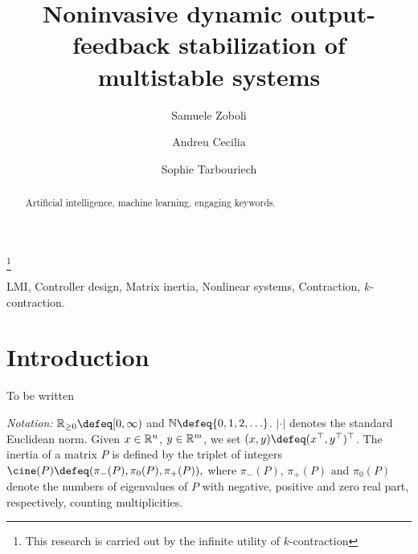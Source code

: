 \documentclass{ifacconf}
\begin{document}
	\begin{frontmatter}
		
		\title{Noninvasive dynamic output-feedback stabilization of multistable systems} 
		
		\thanks[footnoteinfo]{This research is carried out by the infinite utility of $k$-contraction}
		
		\author[First]{Samuele Zoboli} 		
        \author[Second]{Andreu Cecilia}
	\author[First]{Sophie Tarbouriech}
 
		\address[Second]{Universitat Polit\`ecnica de Catalunya, Avinguda Diagonal, 647, 08028 Barcelona, Spain, (e-mail: andreu.cecilia@upc.edu)}
  \address[First]{LAAS-CNRS, Universit\'e de Toulouse, CNRS, Toulouse, (e-mail: samuele.zoboli@laas.fr, sophie.tarbouriech@laas.fr)}
		
		\begin{abstract}                %
   Artificial intelligence, machine learning, engaging keywords.
		\end{abstract}
		
		\begin{keyword}
			LMI, Controller design, Matrix inertia, Nonlinear systems, Contraction, $k$-contraction.
		\end{keyword}
		
	\end{frontmatter}


\section{Introduction}
{\color{red} To be written}

\medskip
\emph{Notation:}  $\RR_{\geq0}\defeq[0,\infty)$ and
$\NN \defeq \{0,1,2,\ldots\}$. $|\cdot|$ denotes the standard Euclidean norm.
Given $x\in {\mathbb{R}}^n$, $y\in {\mathbb{R}}^m$, we set 
$(x,y)\defeq (x^\top , y^\top)^\top$.
The inertia of a matrix $P$ 
is defined by the triplet of integers
$
\cine(P) \defeq (\pi_{-}(P),  \pi_{0}(P), \pi_{+}(P)),
$
where $\pi_{-}({P})$, $\pi_{+}(P)$ and $\pi_{0}(P)$ denote the numbers of eigenvalues of $P$ with negative,
positive and zero real part, respectively, counting multiplicities. 
\end{document}
